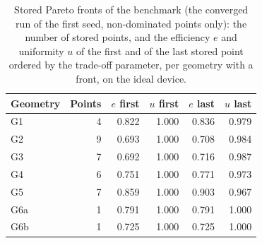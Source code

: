 \begin{table}[t]\centering\footnotesize
\caption{Stored Pareto fronts of the benchmark (the converged run of the first seed, non-dominated points only): the number of stored points, and the efficiency $e$ and uniformity $u$ of the first and of the last stored point ordered by the trade-off parameter, per geometry with a front, on the ideal device.}\label{tab:pareto}
\begin{tabular}{@{}l r r r r r@{}}\toprule Geometry & Points & $e$ first & $u$ first & $e$ last & $u$ last\\\midrule
G1 & 4 & 0.822 & 1.000 & 0.836 & 0.979\\
G2 & 9 & 0.693 & 1.000 & 0.708 & 0.984\\
G3 & 7 & 0.692 & 1.000 & 0.716 & 0.987\\
G4 & 6 & 0.751 & 1.000 & 0.771 & 0.973\\
G5 & 7 & 0.859 & 1.000 & 0.903 & 0.967\\
G6a & 1 & 0.791 & 1.000 & 0.791 & 1.000\\
G6b & 1 & 0.725 & 1.000 & 0.725 & 1.000\\
\bottomrule\end{tabular}\end{table}
